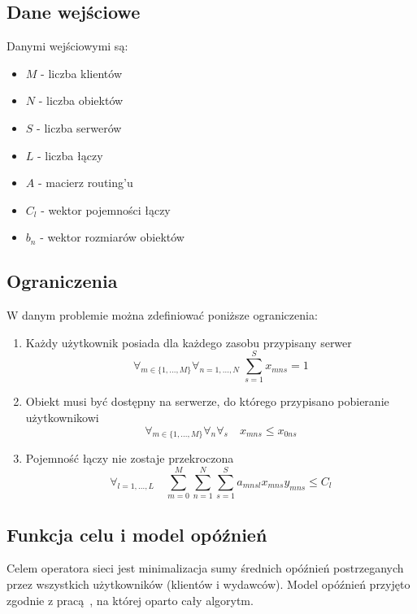 \documentclass{article}
\begin{document}
\subsection{Dane wejściowe}
Danymi wejściowymi są:
\begin{itemize}
    \item $M$ - liczba klientów
    \item $N$ - liczba obiektów
    \item $S$ - liczba serwerów
    \item $L$ - liczba łączy
    \item $A$ - macierz routing'u
    \item $C_l$ - wektor pojemności łączy
    \item $b_n$ - wektor rozmiarów obiektów
\end{itemize}

\subsection{Ograniczenia}
W danym problemie można zdefiniować poniższe ograniczenia:
\begin{enumerate}
    \item Każdy użytkownik posiada dla każdego zasobu przypisany serwer 
        \[\forall_{m\in\{1,...,M\}}\forall_{n=1,...,N}\;\sum^S_{s=1}x_{mns}=1\]
    \item Obiekt musi być dostępny na serwerze, do którego przypisano pobieranie użytkownikowi
        \[\forall_{m\in\{1,...,M\}}\forall_n\forall_s\quad x_{mns}\leq x_{0ns}\]
    \item Pojemność łączy nie zostaje przekroczona
        \[\forall_{l=1,...,L}\quad \sum^M_{m=0}\sum^N_{n=1}\sum^S_{s=1}a_{mnsl}x_{mns}y_{mns}\leq C_l\]
\end{enumerate}

\subsection{Funkcja celu i model opóźnień}
Celem operatora sieci jest minimalizacja sumy średnich opóźnień postrzeganych przez wszystkich użytkowników (klientów i wydawców). Model opóźnień przyjęto zgodnie z pracą~\cite{gasior2012}, na której oparto cały algorytm.
\end{document}
